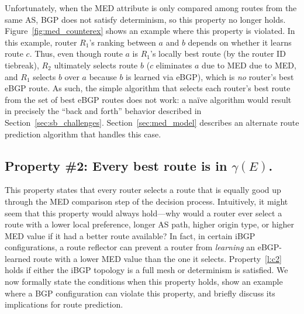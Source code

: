 Unfortunately, when the MED attribute is only compared among routes from
the same AS, BGP does not satisfy determinism, so this property no
longer holds.  Figure~\ref{fig:med_counterex} shows an example where
this property is violated.  In this example, router $R_1$'s ranking
between $a$ and $b$ depends on whether it learns route $c$.  Thus, even
though route $a$ is $R_1$'s locally best route (by the router ID
tiebreak), $R_2$ ultimately selects route $b$ ($c$ eliminates $a$ due to
MED due to MED, and $R_1$ selects $b$ over $a$ because $b$ is learned
via eBGP), which is {\em no} router's best eBGP route.  As such, the
simple algorithm that selects each router's best route from the set of
best eBGP routes does not work: a na\"{i}ve algorithm would result in
precisely the ``back and forth'' behavior described in
Section~\ref{sec:sb_challenges}.  Section~\ref{sec:med_model} describes an
alternate route prediction algorithm that handles this case.


\subsection{Property \#2: Every best route is in $\gamma(E)$.}

This property states that every router selects a route that is equally
good up through the MED comparison step of the decision process.
Intuitively, it might seem that this property would always hold---why
would a router ever select a route with a lower local preference, longer
AS path, higher origin type, or higher MED value if it had a better
route available?  In fact, in certain iBGP configurations, a route
reflector can prevent a router from {\em learning} an eBGP-learned route with
a lower MED value than the one it selects.  Property~\ref{l:c2} holds if either
the iBGP topology is a full mesh or determinism is satisfied.  We now
formally state the conditions when this property holds, show an
example where a BGP configuration can violate this property, and briefly
discuss its implications for route prediction.

